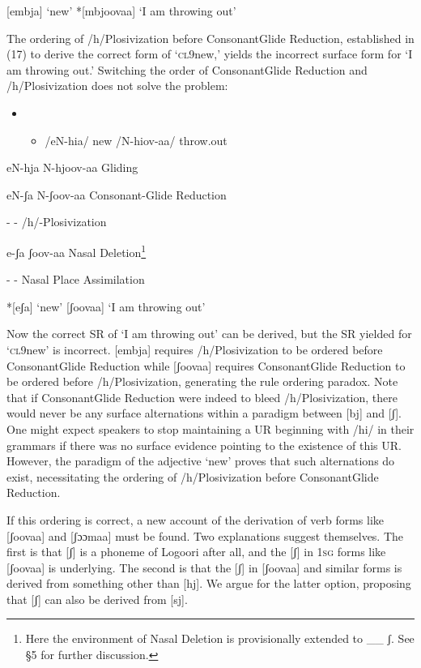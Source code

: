 [embja]  ‘new’    *[mbjoovaa]  ‘I am throwing out’

The ordering of /h/Plosivization before ConsonantGlide Reduction, established in (17) to derive the correct form of ‘\textsc{cl}9new,’ yields the incorrect surface form for ‘\textsc{I} am throwing out.’ Switching the order of ConsonantGlide Reduction and /h/Plosivization does not solve the problem:

\begin{itemize}
\item \setcounter{itemize}{0}
\begin{itemize}
\item /eN-hia/  new  /N-hiov-aa/  throw.out

\end{itemize}
\end{itemize}

eN-hja      N-hjoov-aa        Gliding

eN-ʃa        N-ʃoov-aa        Consonant-Glide Reduction

{}-        {}-          /h/-Plosivization

e-ʃa        ʃoov-aa        Nasal Deletion\footnote{ Here the environment of Nasal Deletion is provisionally extended to \_\_ ʃ. See §5 for further discussion.}

{}-        {}-          Nasal Place Assimilation

*[eʃa]    ‘new’    [ʃoovaa]  ‘I am throwing out’

Now the correct SR of ‘I am throwing out’ can be derived, but the SR yielded for ‘\textsc{cl}9new’ is incorrect. [embja] requires /h/Plosivization to be ordered before ConsonantGlide Reduction while [ʃoovaa] requires ConsonantGlide Reduction to be ordered before /h/Plosivization, generating the rule ordering paradox. Note that if ConsonantGlide Reduction were indeed to bleed /h/Plosivization, there would never be any surface alternations within a paradigm between [bj] and [ʃ]. One might expect speakers to stop maintaining a UR beginning with /hi/ in their grammars if there was no surface evidence pointing to the existence of this UR. However, the paradigm of the adjective ‘new’ proves that such alternations do exist, necessitating the ordering of /h/Plosivization before ConsonantGlide Reduction. 

If this ordering is correct, a new account of the derivation of verb forms like [ʃoovaa] and [ʃɔɔmaa] must be found. Two explanations suggest themselves. The first is that [ʃ] is a phoneme of Logoori after all, and the [ʃ] in 1\textsc{sg} forms like [ʃoovaa] is underlying. The second is that the [ʃ] in [ʃoovaa] and similar forms is derived from something other than [hj]. We argue for the latter option, proposing that [ʃ] can also be derived from [sj].

